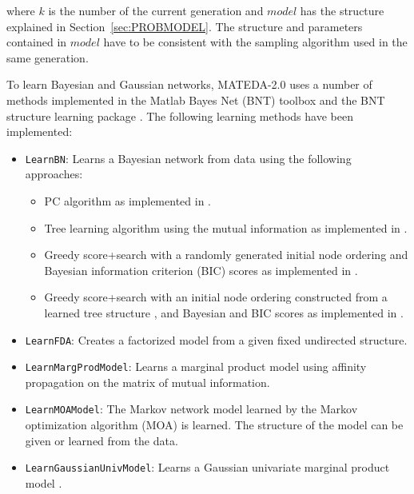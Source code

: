 \documentclass[a4paper]{article}
\begin{document}
where $k$ is the number of the current generation  and $model$ has
the structure explained in Section~\ref{sec:PROBMODEL}. The
structure and parameters contained in $model$ have to be consistent
with the sampling algorithm used in the same generation.

To learn  Bayesian and Gaussian networks, MATEDA-2.0 uses a number
of methods implemented in the Matlab Bayes Net (BNT) toolbox
\cite{Murphy:2001} and the BNT structure learning package
\cite{Leray_and_Francois:2004}.
The following learning methods have
been  implemented:



\begin{itemize}
  \item \texttt{LearnBN}: Learns a Bayesian network from data using the
  following approaches:
  \begin{itemize}
    \item  PC algorithm \cite{Spirtes_et_al:1993}  as implemented in \cite{Murphy:2001}.
    \item  Tree learning algorithm using the mutual information
    \cite{Chow_and_Liu:1968} as implemented in  \cite{Leray_and_Francois:2004}.
    \item Greedy score+search  \cite{Cooper_and_Herskovits:1992}  with a randomly generated initial node
    ordering and Bayesian information criterion (BIC) \cite{Schwarz:1978} scores as implemented in
     \cite{Murphy:2001}.
    \item Greedy score+search  with an initial node
    ordering constructed from a learned tree structure \cite{Leray_and_Francois:2004}, and Bayesian and BIC scores \cite{Cooper_and_Herskovits:1992} as implemented in
     \cite{Murphy:2001}.
  \end{itemize}
  \item \texttt{LearnFDA}:  Creates a factorized model from a given fixed undirected structure.
  \item \texttt{LearnMargProdModel}: Learns a marginal product \cite{Santana_et_al:2008} model using affinity propagation \cite{Frey_and_Dueck:2007} on the matrix of mutual information.
  \item \texttt{LearnMOAModel}: The Markov network model learned by the Markov optimization algorithm (MOA) \cite{Shakya_and_Santana:2008} is
  learned.
  The structure of the model can be given or learned from the data.
  \item \texttt{LearnGaussianUnivModel}: Learns a Gaussian univariate marginal product
  model \cite{Larranhaga_et_al:1999}.

\end{itemize}
\end{document}

